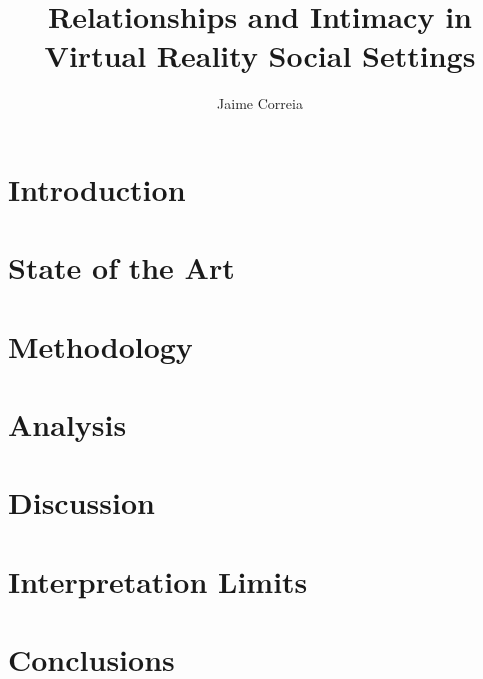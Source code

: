 \documentclass[acmlarge]{acmart}
\begin{document}
\title{Relationships and Intimacy in Virtual Reality Social Settings}

\author{Jaime Correia}
\renewcommand{\shortauthors}{Correia}

\begin{abstract}
  \label{section::abstract}
\end{abstract}

\maketitle

\section{Introduction}\label{sec::introduction}
\section{State of the Art}\label{sec::soa}
\section{Methodology}\label{sec::methodology}
\section{Analysis}\label{sec::analysis}
\section{Discussion}\label{sec::discussion}
\section{Interpretation Limits}\label{sec::interpretationlimits}
\section{Conclusions}\label{sec::conclusions}





\end{document}
